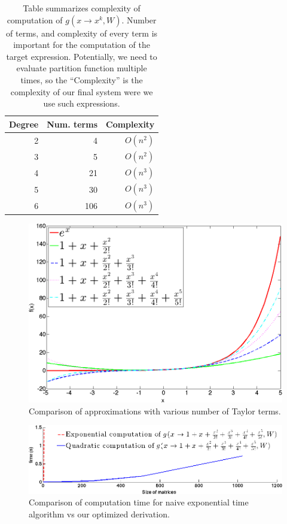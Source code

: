 \begin{table}
\tiny
\centering
\begin{tabular}{rrr}
\hline
Degree & Num. terms & Complexity \\
\hline
2 & 4 & $O(n^2)$\\
3 & 5 & $O(n^2)$\\
4 & 21 & $O(n^3)$\\
5 & 30 & $O(n^3)$\\
6 & 106 & $O(n^3)$\\
\hline
\end{tabular}
\caption{Table summarizes complexity of computation of $g(x \rightarrow x^k, W)$. 
Number of terms, and complexity of every term is important for the computation of the target expression.
Potentially, we need to evaluate partition function multiple times, so the ``Complexity''
is the complexity of our final system were we use such expressions.} 
\label{eval}
\end{table}

\begin{figure}[h]
\centering
\includegraphics[scale=0.2]{img/approximations.png}
\caption{Comparison of approximations with various number of Taylor terms.}
\label{approximations}
\end{figure}



\begin{figure}[h]
\centering
\includegraphics[scale=0.24]{img/time_approx.png}
\caption{Comparison of computation time for naive exponential time algorithm vs our optimized derivation.}
\label{time_approx}
\end{figure}


